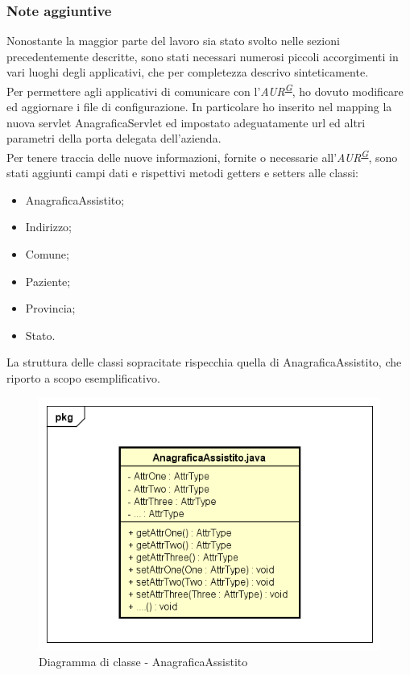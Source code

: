\documentclass[a4paper]{article}
\begin{document}
\subsubsection{Note aggiuntive}
Nonostante la maggior parte del lavoro sia stato svolto nelle sezioni precedentemente descritte, sono stati necessari numerosi piccoli accorgimenti in vari luoghi degli applicativi, che per completezza descrivo sinteticamente.
\\
Per permettere agli applicativi di comunicare con l'\textit{AUR\textsuperscript{\hyperref[sec:gl]{G}}}, ho dovuto modificare ed aggiornare i file di configurazione. In particolare ho inserito nel mapping la nuova servlet AnagraficaServlet ed impostato adeguatamente url ed altri parametri della porta delegata dell'azienda.
\\
Per tenere traccia delle nuove informazioni, fornite o necessarie all'\textit{AUR\textsuperscript{\hyperref[sec:gl]{G}}}, sono stati aggiunti campi dati e rispettivi metodi getters e setters alle classi:
\begin{itemize}
	\item AnagraficaAssistito;
	\item Indirizzo;
    \item Comune;
	\item Paziente;
	\item Provincia;
	\item Stato.
\end{itemize}
La struttura delle classi sopracitate rispecchia quella di AnagraficaAssistito, che riporto a scopo esemplificativo.
\begin{figure}[H]
	\centering
	\includegraphics[width=\linewidth]{uml/anagraficaassistito.png}
	\caption{Diagramma di classe - AnagraficaAssistito}
\end{figure}
\end{document}
